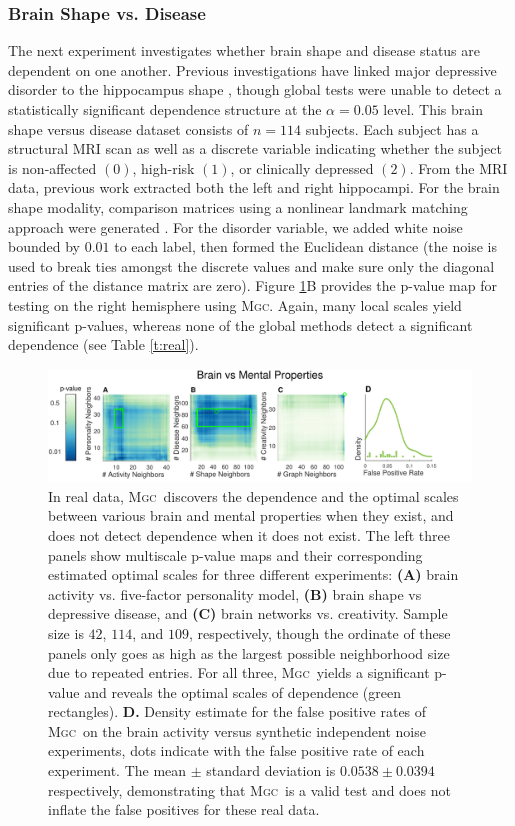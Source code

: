 \documentclass[11pt]{article}
\providecommand{\sct}[1]{{\normalfont\textsc{#1}}}
\newcommand{\Mgc}{\sct{Mgc}}
\begin{document}
\subsubsection*{Brain Shape vs. Disease} 


The next experiment investigates whether brain shape and disease status are dependent on one another.  Previous investigations have linked major depressive disorder to the hippocampus shape \cite{ParkEtAl2008,PosenerEtAl2003}, though global tests were unable to detect a statistically significant dependence structure at the $\alpha=0.05$ level.
This brain shape versus disease dataset consists of $n=114$ subjects. Each subject has a structural MRI scan as well as a discrete variable indicating whether the subject is non-affected $(0)$, high-risk $(1)$, or clinically depressed $(2)$.  From the MRI data, previous work extracted both the left and right hippocampi. For the brain shape modality, comparison matrices using a nonlinear landmark matching approach were generated \cite{ParkEtAl2008,BegEtAl2005}. For the disorder variable, we added white noise bounded by $0.01$ to each label, then formed the Euclidean distance (the noise is used to break ties amongst the discrete values and make sure only the diagonal entries of the distance matrix are zero).
% 
Figure \ref{f:real}{\color{magenta}B} provides the p-value map for testing on the right hemisphere using \Mgc. Again, many local scales yield significant p-values, whereas none of the global methods detect a significant dependence  (see Table \ref{t:real}). 

\begin{figure}[htbp]
\includegraphics[width=1.0\textwidth,trim={0 0 1.5cm 0},clip]{Figures/FigReal}
\caption{In real data, \Mgc~discovers the dependence and the optimal scales between various brain and mental properties when they exist, and does not detect dependence when it does not exist.  The left three panels show multiscale p-value maps and their corresponding estimated optimal scales for three different experiments: \textbf{(A)}  brain activity vs. five-factor personality model, \textbf{(B)}  brain shape vs depressive disease, and \textbf{(C)} brain networks vs. creativity. Sample size is $42$, $114$, and $109$, respectively, though the ordinate of these panels only goes as high as the largest possible neighborhood size due to repeated entries.  
For all three, \Mgc~yields a significant p-value and reveals the optimal scales of dependence (green rectangles).
\textbf{D.} Density estimate for the false positive rates of  \Mgc~on the brain activity versus synthetic independent noise experiments, dots indicate with the false positive rate of each experiment. The mean $\pm$ standard deviation is $0.0538 \pm 0.0394$ respectively, demonstrating that \Mgc~is a valid test and does not inflate the false positives for these real data.}
\label{f:real}
\end{figure}
\end{document}
